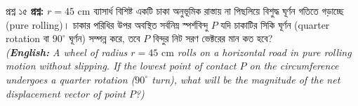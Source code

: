 \documentclass[11pt,a4paper]{article}
\begin{document}
\vspace{0.4cm}

\begin{qbox}{প্রশ্ন ১৫}
\textbf{প্রশ্ন:} $r = 45\text{ cm}$ ব্যাসার্ধ বিশিষ্ট একটি চাকা অনুভূমিক রাস্তায় না পিছলিয়ে বিশুদ্ধ ঘূর্ণন গতিতে গড়াচ্ছে (pure rolling)। চাকার পরিধির উপর অবস্থিত সর্বনিম্ন স্পর্শবিন্দু $P$ যদি চাকাটির সিকি ঘূর্ণন (quarter rotation বা $90^\circ$ ঘূর্ণন) সম্পন্ন করে, তবে $P$ বিন্দুর নিট সরণ ভেক্টরের মান কত হবে? \\
\textit{(\textbf{English:} A wheel of radius $r = 45\text{ cm}$ rolls on a horizontal road in pure rolling motion without slipping. If the lowest point of contact $P$ on the circumference undergoes a quarter rotation ($90^\circ$ turn), what will be the magnitude of the net displacement vector of point $P$?)}
\end{qbox}
\end{document}
